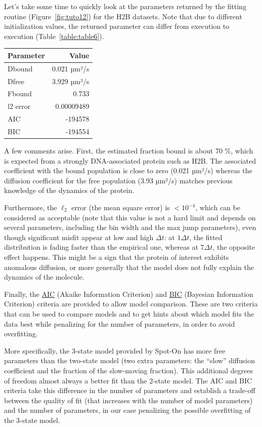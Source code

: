 Let's take some time to quickly look at the parameters returned by the fitting routine (Figure~\ref{fig:tuto12}) for the H2B datasets. Note that due to different initialization values, the returned parameter can differ from execution to execution (Table~\ref{table:table6}).

\begin{center}
\label{table:table6}
  \begin{tabular}{lr}
Parameter & Value\\
\hline
Dbound & 0.021 µm²/s\\
Dfree & 3.929 µm²/s\\
Fbound & 0.733\\
l2 error & 0.00009489\\
AIC & -194578\\
BIC & -194554\\
\end{tabular}
\end{center}

A few comments arise. First, the estimated fraction bound is about 70 \%, which is expected from a strongly DNA-associated protein such as H2B. The associated coefficient with the bound population is close to zero (0.021 µm²/s) whereas the diffusion coefficient for the free population (3.93 µm²/s) matches previous knowledge of the dynamics of the protein.

Furthermore, the \(\ell_2\) error (the mean square error) is   \(< 10^{-4}\), which can be considered as acceptable (note that this value is not a hard limit and depends on several parameters, including the bin width and the max jump parameters), even though significant misfit appear at low and high \(\Delta t\):  at \(1\Delta t\), the fitted distribution is fading faster than the empirical one, whereas at \(7\Delta t\), the opposite effect happens. This might be a sign that the protein of interest exhibits anomalous diffusion, or more generally that the model does not fully explain the dynamics of the molecule.

Finally, the \href{https://en.wikipedia.org/wiki/Akaike_information_criterion}{AIC} (Akaike Information Criterion) and \href{https://en.wikipedia.org/wiki/Bayesian_information_criterion}{BIC} (Bayesian Information Criterion) criteria are provided to allow model comparison. These are two criteria that can be used to compare models and to get hints about which model fits the data best while penalizing for the number of parameters, in order to avoid overfitting.

More specifically, the 3-state model provided by Spot-On has more free parameters than the two-state model (two extra parameters: the ``slow'' diffusion coefficient and the fraction of the slow-moving fraction). This additional degrees of freedom almost always a better fit than the 2-state model. The AIC and BIC criteria take this difference in the number of parameters and establish a trade-off between the quality of fit (that increases with the number of model parameters) and the number of parameters, in our case penalizing the possible overfitting of the 3-state model.

